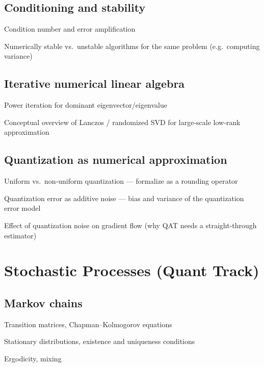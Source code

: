 \subsection{Conditioning and stability}
\begin{tasklist}
    \item Condition number and error amplification
    \item Numerically stable vs.\ unstable algorithms for the same problem (e.g.\ computing variance)
\end{tasklist}

\subsection{Iterative numerical linear algebra}
\begin{tasklist}
    \item Power iteration for dominant eigenvector/eigenvalue
    \item Conceptual overview of Lanczos / randomized SVD for large-scale low-rank approximation
\end{tasklist}

\subsection{Quantization as numerical approximation}
\begin{tasklist}
    \item Uniform vs.\ non-uniform quantization — formalize as a rounding operator
    \item Quantization error as additive noise — bias and variance of the quantization error model
    \item Effect of quantization noise on gradient flow (why QAT needs a straight-through estimator)
\end{tasklist}

\section{Stochastic Processes (Quant Track)}

\subsection{Markov chains}
\begin{tasklist}
    \item Transition matrices, Chapman--Kolmogorov equations
    \item Stationary distributions, existence and uniqueness conditions
    \item Ergodicity, mixing
\end{tasklist}

